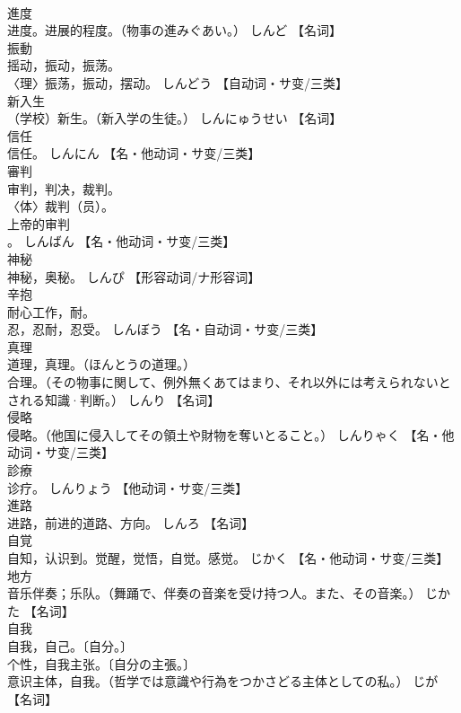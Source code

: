 \documentclass[8pt]{extreport}
\begin{document}
\begin{CJK}{UTF8}{min}
\\	進度	
\\	进度。进展的程度。（物事の進みぐあい。）	しんど		【名词】
\\	振動	
\\	摇动，振动，振荡。 
\\	〈理〉振荡，振动，摆动。	しんどう		【自动词・サ变/三类】
\\	新入生	
\\	（学校）新生。（新入学の生徒。）	しんにゅうせい		【名词】
\\	信任	
\\	信任。	しんにん		【名・他动词・サ变/三类】
\\	審判	
\\	审判，判决，裁判。 
\\	〈体〉裁判（员）。 
\\	上帝的审判
\\	。	しんばん		【名・他动词・サ变/三类】
\\	神秘	
\\	神秘，奥秘。	しんぴ		【形容动词/ナ形容词】
\\	辛抱	
\\	耐心工作，耐。 
\\	忍，忍耐，忍受。	しんぼう		【名・自动词・サ变/三类】
\\	真理	
\\	道理，真理。（ほんとうの道理。） 
\\	合理。（その物事に関して、例外無くあてはまり、それ以外には考えられないとされる知識·判断。）	しんり		【名词】
\\	侵略	
\\	侵略。（他国に侵入してその領土や財物を奪いとること。）	しんりゃく		【名・他动词・サ变/三类】
\\	診療	
\\	诊疗。	しんりょう		【他动词・サ变/三类】
\\	進路	
\\	进路，前进的道路、方向。	しんろ		【名词】
\\	自覚	
\\	自知，认识到。觉醒，觉悟，自觉。感觉。	じかく		【名・他动词・サ变/三类】
\\	地方	
\\	音乐伴奏；乐队。（舞踊で、伴奏の音楽を受け持つ人。また、その音楽。）	じかた		【名词】
\\	自我	
\\	自我，自己。〔自分。〕 
\\	个性，自我主张。〔自分の主張。〕 
\\	意识主体，自我。（哲学では意識や行為をつかさどる主体としての私。）	じが		【名词】

\end{CJK}
\end{document}
